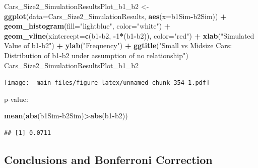 \documentclass[]{book}
\newenvironment{Shaded}{\begin{snugshade}}{\end{snugshade}}
\newcommand{\KeywordTok}[1]{\textcolor[rgb]{0.13,0.29,0.53}{\textbf{#1}}}
\newcommand{\DataTypeTok}[1]{\textcolor[rgb]{0.13,0.29,0.53}{#1}}
\newcommand{\DecValTok}[1]{\textcolor[rgb]{0.00,0.00,0.81}{#1}}
\newcommand{\StringTok}[1]{\textcolor[rgb]{0.31,0.60,0.02}{#1}}
\newcommand{\OperatorTok}[1]{\textcolor[rgb]{0.81,0.36,0.00}{\textbf{#1}}}
\newcommand{\NormalTok}[1]{#1}
\begin{document}
\begin{Shaded}
\begin{Highlighting}[]
\NormalTok{Cars_Size2_SimulationResultsPlot_b1_b2 <-}\StringTok{ }\KeywordTok{ggplot}\NormalTok{(}\DataTypeTok{data=}\NormalTok{Cars_Size2_SimulationResults, }\KeywordTok{aes}\NormalTok{(}\DataTypeTok{x=}\NormalTok{b1Sim}\OperatorTok{-}\NormalTok{b2Sim)) }\OperatorTok{+}\StringTok{ }
\StringTok{  }\KeywordTok{geom_histogram}\NormalTok{(}\DataTypeTok{fill=}\StringTok{"lightblue"}\NormalTok{, }\DataTypeTok{color=}\StringTok{"white"}\NormalTok{) }\OperatorTok{+}\StringTok{ }\KeywordTok{geom_vline}\NormalTok{(}\DataTypeTok{xintercept=}\KeywordTok{c}\NormalTok{(b1}\OperatorTok{-}\NormalTok{b2, }\OperatorTok{-}\DecValTok{1}\OperatorTok{*}\NormalTok{(b1}\OperatorTok{-}\NormalTok{b2)), }\DataTypeTok{color=}\StringTok{"red"}\NormalTok{) }\OperatorTok{+}\StringTok{ }
\StringTok{  }\KeywordTok{xlab}\NormalTok{(}\StringTok{"Simulated Value of b1-b2"}\NormalTok{) }\OperatorTok{+}\StringTok{ }\KeywordTok{ylab}\NormalTok{(}\StringTok{"Frequency"}\NormalTok{) }\OperatorTok{+}\StringTok{ }
\StringTok{  }\KeywordTok{ggtitle}\NormalTok{(}\StringTok{"Small vs Midsize Cars: Distribution of b1-b2 under assumption of no relationship"}\NormalTok{)}
\NormalTok{Cars_Size2_SimulationResultsPlot_b1_b2}
\end{Highlighting}
\end{Shaded}

\texttt{[image: \_main\_files/figure-latex/unnamed-chunk-354-1.pdf]}

p-value:

\begin{Shaded}
\begin{Highlighting}[]
\KeywordTok{mean}\NormalTok{(}\KeywordTok{abs}\NormalTok{(b1Sim}\OperatorTok{-}\NormalTok{b2Sim)}\OperatorTok{>}\KeywordTok{abs}\NormalTok{(b1}\OperatorTok{-}\NormalTok{b2))}
\end{Highlighting}
\end{Shaded}

\begin{verbatim}
## [1] 0.0711
\end{verbatim}

\subsection{Conclusions and Bonferroni
Correction}\label{conclusions-and-bonferroni-correction}
\end{document}
